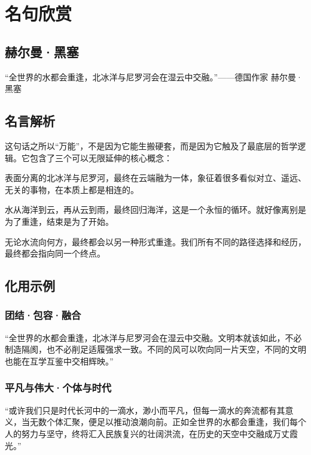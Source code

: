 \chapter{名句欣赏}


\section{赫尔曼·黑塞}

“全世界的水都会重逢，北冰洋与尼罗河会在湿云中交融。”——德国作家 赫尔曼·黑塞

\vspace{1em}

\section*{名言解析}
这句话之所以“万能”，不是因为它能生搬硬套，而是因为它触及了最底层的哲学逻辑。它包含了三个可以无限延伸的核心概念：

\begin{tcolorbox}[colback=blue!5, colframe=blue!50, title=万物归一]
表面分离的北冰洋与尼罗河，最终在云端融为一体，象征着很多看似对立、遥远、无关的事物，在本质上都是相连的。
\end{tcolorbox}

\begin{tcolorbox}[colback=green!5, colframe=green!50, title=循环往复]
水从海洋到云，再从云到雨，最终回归海洋，这是一个永恒的循环。就好像离别是为了重逢，结束是为了开始。
\end{tcolorbox}

\begin{tcolorbox}[colback=orange!5, colframe=orange!50, title=殊途同归]
无论水流向何方，最终都会以另一种形式重逢。我们所有不同的路径选择和经历，最终都会指向同一个终点。
\end{tcolorbox}

\section{化用示例}

\subsection*{团结·包容·融合}
“全世界的水都会重逢，北冰洋与尼罗河会在湿云中交融。文明本就该如此，不必制造隔阂，也不必削足适履强求一致。不同的风可以吹向同一片天空，不同的文明也能在互学互鉴中交相辉映。”

\subsection*{平凡与伟大·个体与时代}
“或许我们只是时代长河中的一滴水，渺小而平凡，但每一滴水的奔流都有其意义，当无数个体汇聚，便足以推动浪潮向前。正如全世界的水都会重逢，我们每个人的努力与坚守，终将汇入民族复兴的壮阔洪流，在历史的天空中交融成万丈霞光。”

